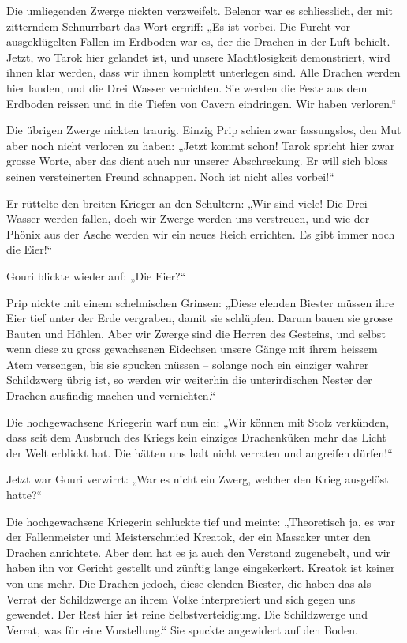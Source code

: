 \documentclass[10pt, a4paper, oneside]{book}
\begin{document}
Die umliegenden Zwerge nickten verzweifelt. Belenor war es schliesslich, der mit zitterndem Schnurrbart das Wort ergriff: „Es ist vorbei. Die Furcht vor ausgeklügelten Fallen im Erdboden war es, der die Drachen in der Luft behielt. Jetzt, wo Tarok hier gelandet ist, und unsere Machtlosigkeit demonstriert, wird ihnen klar werden, dass wir ihnen komplett unterlegen sind. Alle Drachen werden hier landen, und die Drei Wasser vernichten. Sie werden die Feste aus dem Erdboden reissen und in die Tiefen von Cavern eindringen. Wir haben verloren.“

Die übrigen Zwerge nickten traurig. Einzig Prip schien zwar fassungslos, den Mut aber noch nicht verloren zu haben: „Jetzt kommt schon! Tarok spricht hier zwar grosse Worte, aber das dient auch nur unserer Abschreckung. Er will sich bloss seinen versteinerten Freund schnappen. Noch ist nicht alles vorbei!“

Er rüttelte den breiten Krieger an den Schultern: „Wir sind viele! Die Drei Wasser werden fallen, doch wir Zwerge werden uns verstreuen, und wie der Phönix aus der Asche werden wir ein neues Reich errichten. Es gibt immer noch die Eier!“

Gouri blickte wieder auf: „Die Eier?“

Prip nickte mit einem schelmischen Grinsen: „Diese elenden Biester müssen ihre Eier tief unter der Erde vergraben, damit sie schlüpfen. Darum bauen sie grosse Bauten und Höhlen. Aber wir Zwerge sind die Herren des Gesteins, und selbst wenn diese zu gross gewachsenen Eidechsen unsere Gänge mit ihrem heissem Atem versengen, bis sie spucken müssen – solange noch ein einziger wahrer Schildzwerg übrig ist, so werden wir weiterhin die unterirdischen Nester der Drachen ausfindig machen und vernichten.“

Die hochgewachsene Kriegerin warf nun ein: „Wir können mit Stolz verkünden, dass seit dem Ausbruch des Kriegs kein einziges Drachenküken mehr das Licht der Welt erblickt hat. Die hätten uns halt nicht verraten und angreifen dürfen!“

Jetzt war Gouri verwirrt: „War es nicht ein Zwerg, welcher den Krieg ausgelöst hatte?“

Die hochgewachsene Kriegerin schluckte tief und meinte: „Theoretisch ja, es war der Fallenmeister und Meisterschmied Kreatok, der ein Massaker unter den Drachen anrichtete. Aber dem hat es ja auch den Verstand zugenebelt, und wir haben ihn vor Gericht gestellt und zünftig lange eingekerkert. Kreatok ist keiner von uns mehr. Die Drachen jedoch, diese elenden Biester, die haben das als Verrat der Schildzwerge an ihrem Volke interpretiert und sich gegen uns gewendet. Der Rest hier ist reine Selbstverteidigung. Die Schildzwerge und Verrat, was für eine Vorstellung.“ Sie spuckte angewidert auf den Boden.
\end{document}
